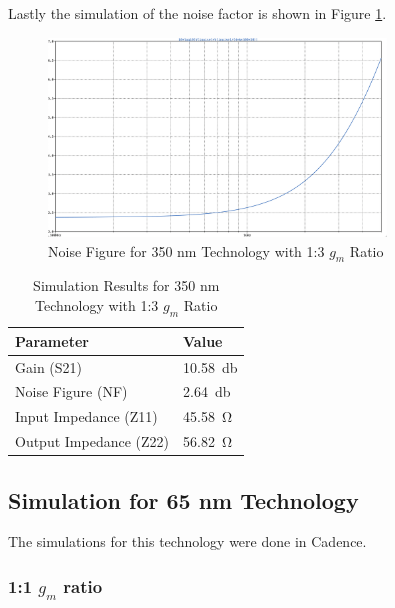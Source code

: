 Lastly the simulation of the noise factor is shown in Figure \ref{fig:350nm_1ton-NF}.
\begin{figure}[H]
    \centering
    \includegraphics[width=0.8\textwidth]{Images/3501to3Noise.png}
    \caption{Noise Figure for 350 nm Technology with 1:3 $g_m$ Ratio}
    \label{fig:350nm_1ton-NF}
\end{figure}

\begin{table}[H]
    \centering
    \caption{Simulation Results for 350 nm Technology with 1:3 $g_m$ Ratio}
    \begin{tabularx}{\textwidth}{>{\centering\arraybackslash}X >{\centering\arraybackslash}X }
        \toprule
        \textbf{Parameter} & \textbf{Value}\\
        \midrule
        Gain (S21) & \SI{10.58}{\decibel} \\
        \midrule
        Noise Figure (NF) & \SI{2.64}{\decibel} \\
        \midrule
        Input Impedance (Z11) & \SI{45.58}{\ohm} \\
        \midrule
        Output Impedance (Z22) & \SI{56.82}{\ohm} \\
        \bottomrule
    \end{tabularx}
    \label{tab:350nm_1ton_results}
\end{table}

\subsection{Simulation for 65 nm Technology}

The simulations for this technology were done in Cadence. 

\subsubsection{1:1 $g_m$ ratio}

